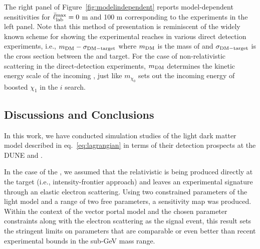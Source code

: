 The right panel of Figure~\ref{fig:modelindependent} reports model-dependent sensitivities for $\bar{\ell}_{\rm lab}^{\rm max} = 0$ m and 100 m corresponding to the experiments in the left panel.
Note that this %
method of presentation is reminiscent of the widely known scheme for showing the experimental reaches in various  direct detection experiments, i.e., $m_{\rm DM} - \sigma_{\rm DM - target}$ where $m_{\rm DM}$ is the mass of  and $\sigma_{\rm DM - target}$ is the cross section between the  and target. 
For the case of non-relativistic  scattering in the direct-detection experiments, $m_{\rm DM}$ determines the kinetic energy scale of the incoming , just like $m_{\chi_0}$ sets out the incoming energy of boosted $\chi_1$ in the $i$ search. 

\subsection{Discussions and Conclusions}

In this work, we have conducted simulation studies of the light dark matter model described in eq.~\eqref{eq:lagrangian} in terms of their detection prospects at the DUNE  and . 

In the case of the , we assumed that the relativistic  is being produced directly at the target (i.e., intensity-frontier approach) and leaves an experimental signature through an elastic electron scattering. Using two constrained parameters of the light  model and a range of two free parameters, a sensitivity map was produced. Within the context of the vector portal  model and the chosen parameter constraints along with the electron scattering as the signal event, this result sets the stringent limits on  parameters that are comparable or even better than recent experimental bounds in the sub-GeV mass range.

